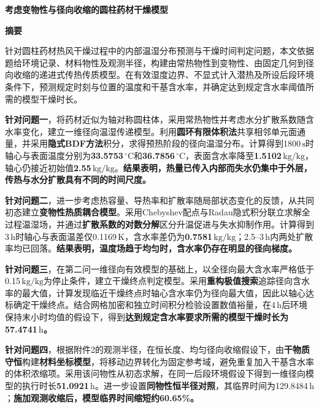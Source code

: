 \documentclass[UTF8,a4paper,zihao=-4,fontset=windows]{ctexart}
\newcommand{\unit}[1]{\ensuremath{\,\mathrm{#1}}}
\newcommand{\celsius}{\ensuremath{\,{}^\circ\mathrm{C}}}
\begin{document}
\begin{center}
{\LARGE\bfseries 考虑变物性与径向收缩的圆柱药材干燥模型\par}
\vspace{0.7em}
{\large\bfseries 摘\quad 要}
\end{center}
\begingroup
\linespread{1}\fontsize{11.5}{18}\selectfont
\setlength{\parindent}{2em}
\setlength{\parskip}{5pt}
\noindent\hspace*{2em}针对圆柱药材热风干燥过程中的内部温湿分布预测与干燥时间判定问题，本文依据题给环境记录、材料物性及观测半径，构建由常热物性到变物性、由固定几何到径向收缩的递进式传热传质模型。在有效湿度边界、不显式计入潜热及所设后段环境条件下，预测规定时刻与位置的温度和干基含水率，并确定达到规定含水率阈值所需的模型干燥时长。

\textbf{针对问题一}，将药材近似为轴对称圆柱体，采用常热物性并考虑水分扩散系数随含水率变化，建立一维径向温湿传递模型。利用\textbf{圆环有限体积法}共享相邻单元面通量，并采用\textbf{隐式BDF方法}积分，求得预热阶段的径向温湿分布。计算得到1800\unit{s}时轴心与表面温度分别为\textbf{33.5753\celsius}和\textbf{36.7856\celsius}，表面含水率降至\textbf{1.5102\unit{kg/kg}}，轴心仍接近初始值\textbf{2.55\unit{kg/kg}}。\textbf{结果表明，热量已传入内部而失水仍集中于外层，传热与水分扩散具有不同的时间尺度。}

\textbf{针对问题二}，进一步考虑热容量、导热率和扩散率随局部状态变化的反馈，从共同初态建立\textbf{变物性热质耦合模型}。采用Chebyshev配点与Radau隐式积分联立求解全过程温湿场，并通过\textbf{扩散系数的对数分解}区分升温促进与失水抑制作用。计算得到3\unit{h}时轴心与表面温差仅0.1169\unit{K}，含水率差仍为\textbf{0.7581\unit{kg/kg}}；2.5--3\unit{h}内两处扩散率均已回落。\textbf{结果表明，温度场趋于均匀时，含水率仍存在明显的径向梯度。}

\textbf{针对问题三}，在第二问一维径向有效模型的基础上，以全径向最大含水率严格低于0.15\unit{kg/kg}为停止条件，建立干燥终点判定模型。采用\textbf{重构极值搜索}追踪径向含水率的最大值，计算发现临近干燥终点时轴心含水率仍为径向最大值，因此以轴心达标确定干燥终点。结合网格加密和独立时间积分检验设置数值裕量，在4\unit{h}后环境保持末小时均值的假设下，得到\textbf{达到规定含水率要求所需的模型干燥时长为57.4741\unit{h}。}

\textbf{针对问题四}，根据附件2的观测半径，在恒长度、均匀径向收缩假设下，由\textbf{干物质守恒}构建\textbf{材料坐标模型}，将移动边界转化为固定参考域，避免重复加入干基含水率的体积浓缩项。采用该问物性从初态求解，在同一后段环境假设下得到一维径向模型的执行时长\textbf{51.0921\unit{h}}。进一步设置\textbf{同物性恒半径对照}，其临界时间为129.8484\unit{h}；\textbf{施加观测收缩后，模型临界时间缩短约60.65\%。}
\end{document}
